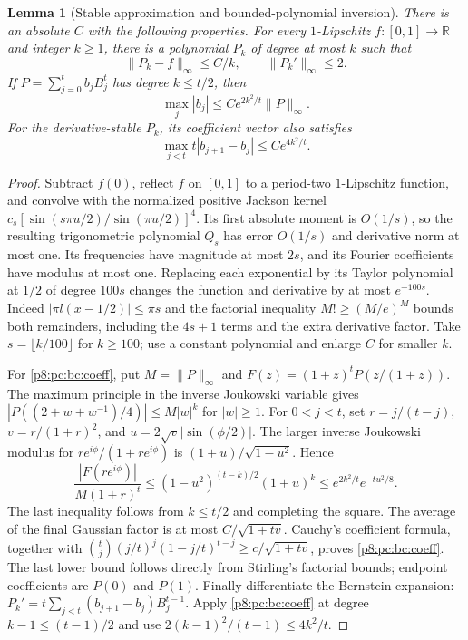 \documentclass[11pt,a4paper]{article}
\newtheorem{lemma}[theorem]{Lemma}
\theoremstyle{definition}
\theoremstyle{remark}
\numberwithin{equation}{section}
\begin{document}
\begin{lemma}[Stable approximation and bounded-polynomial inversion]
\label{p8:pc:bc:approx}
There is an absolute $C$ with the following properties.
For every $1$-Lipschitz $f:[0,1]\to\mathbb R$ and integer $k\ge1$, there
is a polynomial $P_k$ of degree at most $k$ such that
\[
 \|P_k-f\|_\infty\le C/k,\qquad \|P_k'\|_\infty\le2.
\]
If $P=\sum_{j=0}^t b_jB_j^t$ has degree $k\le t/2$, then
\begin{equation}\label{p8:pc:bc:coeff}
 \max_j|b_j|\le Ce^{2k^2/t}\|P\|_\infty.
\end{equation}
For the derivative-stable $P_k$, its coefficient vector also satisfies
\begin{equation}\label{p8:pc:bc:coefflip}
 \max_{j<t}t|b_{j+1}-b_j|\le Ce^{4k^2/t}.
\end{equation}
\end{lemma}
\begin{proof}
Subtract $f(0)$, reflect $f$ on $[0,1]$ to a period-two $1$-Lipschitz
function, and convolve with the normalized positive Jackson kernel
$c_s[\sin(s\pi u/2)/\sin(\pi u/2)]^4$. Its first absolute moment is
$O(1/s)$, so the resulting trigonometric polynomial $Q_s$ has error
$O(1/s)$ and derivative norm at most one. Its frequencies have magnitude
at most $2s$, and its Fourier coefficients have modulus at most one.
Replacing each exponential by its Taylor polynomial at $1/2$ of degree
$100s$ changes the function and derivative by at most $e^{-100s}$.
Indeed $|\pi l(x-1/2)|\le\pi s$ and the factorial inequality
$M!\ge(M/e)^M$ bounds both remainders, including the $4s+1$ terms and the
extra derivative factor. Take $s=\lfloor k/100\rfloor$ for $k\ge100$;
use a constant polynomial and enlarge $C$ for smaller $k$.

For \eqref{p8:pc:bc:coeff}, put $M=\|P\|_\infty$ and
$F(z)=(1+z)^tP(z/(1+z))$. The maximum principle in the inverse Joukowski
variable gives
$|P((2+w+w^{-1})/4)|\le M|w|^k$ for $|w|\ge1$.
For $0<j<t$, set $r=j/(t-j)$, $v=r/(1+r)^2$, and
$u=2\sqrt v|\sin(\phi/2)|$. The larger inverse Joukowski modulus for
$re^{i\phi}/(1+re^{i\phi})$ is $(1+u)/\sqrt{1-u^2}$. Hence
\[
 \frac{|F(re^{i\phi})|}{M(1+r)^t}
 \le(1-u^2)^{(t-k)/2}(1+u)^k
 \le e^{2k^2/t}e^{-tu^2/8}.
\]
The last inequality follows from $k\le t/2$ and completing the square.
The average of the final Gaussian factor is at most
$C/\sqrt{1+tv}$. Cauchy's coefficient formula, together with
$\binom tj(j/t)^j(1-j/t)^{t-j}\ge c/\sqrt{1+tv}$, proves
\eqref{p8:pc:bc:coeff}. The last lower bound follows directly from Stirling's
factorial bounds; endpoint coefficients are $P(0)$ and $P(1)$.
Finally differentiate the Bernstein expansion:
$P_k'=t\sum_{j<t}(b_{j+1}-b_j)B_j^{t-1}$.
Apply \eqref{p8:pc:bc:coeff} at degree $k-1\le(t-1)/2$ and use
$2(k-1)^2/(t-1)\le4k^2/t$.
\end{proof}
\end{document}
